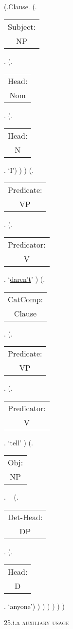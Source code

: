 \documentclass[12pt,letterpaper]{article}
\begin{document}
\begin{figure}
	\begin{center}
		\begin{parsetree}
			(.Clause.
			(.\begin{tabular}{c}Subject:\\NP\end{tabular}.  
			(.\begin{tabular}{c}Head:\\Nom\end{tabular}.
			(.\begin{tabular}{c}Head:\\N\end{tabular}. `I')
			)
			)
			(.\begin{tabular}{c}Predicate:\\VP\end{tabular}.
			(.\begin{tabular}{c}Predicator:\\V\end{tabular}.    `\underline{daren't}' )
			(.\begin{tabular}{c}CatComp:\\Clause\end{tabular}. 
			(.\begin{tabular}{c}Predicate:\\VP\end{tabular}.
			(.\begin{tabular}{c}Predicator:\\V\end{tabular}.    `tell' )
			(.\begin{tabular}{c}Obj:\\NP\end{tabular}. ~
			(.\begin{tabular}{c}Det-Head:\\DP\end{tabular}. 
			(.\begin{tabular}{c}Head:\\D\end{tabular}. `anyone')
			)
			)
			)
			)
			)
			)
			
			
		\end{parsetree}
		\hfill \break \hfill \break
		25.i.a \textsc{auxiliary usage}
	\end{center}
\end{figure}
\end{document}
